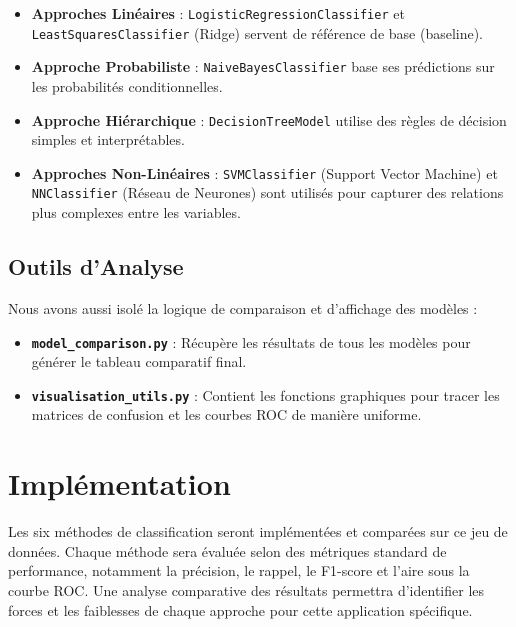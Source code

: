 \documentclass[11pt]{article}
\providecommand{\tightlist}{%
      \setlength{\itemsep}{0pt}\setlength{\parskip}{0pt}}
\begin{document}
\begin{itemize}
  \tightlist
  \item
        \textbf{Approches Linéaires} : \texttt{LogisticRegressionClassifier}
        et \texttt{LeastSquaresClassifier} (Ridge) servent de référence de
        base (baseline).
  \item
        \textbf{Approche Probabiliste} : \texttt{NaiveBayesClassifier} base
        ses prédictions sur les probabilités conditionnelles.
  \item
        \textbf{Approche Hiérarchique} : \texttt{DecisionTreeModel} utilise
        des règles de décision simples et interprétables.
  \item
        \textbf{Approches Non-Linéaires} : \texttt{SVMClassifier} (Support
        Vector Machine) et \texttt{NNClassifier} (Réseau de Neurones) sont
        utilisés pour capturer des relations plus complexes entre les
        variables.
\end{itemize}

\subsection{Outils d'Analyse}\label{outils-danalyse}

Nous avons aussi isolé la logique de comparaison et d'affichage des
modèles :

\begin{itemize}
  \tightlist
  \item
        \textbf{\texttt{model\_comparison.py}} : Récupère les résultats de
        tous les modèles pour générer le tableau comparatif final.
  \item
        \textbf{\texttt{visualisation\_utils.py}} : Contient les fonctions
        graphiques pour tracer les matrices de confusion et les courbes ROC de
        manière uniforme.
\end{itemize}

\section{Implémentation}\label{impluxe9mentation}

Les six méthodes de classification seront implémentées et comparées sur
ce jeu de données. Chaque méthode sera évaluée selon des métriques
standard de performance, notamment la précision, le rappel, le F1-score
et l'aire sous la courbe ROC. Une analyse comparative des résultats
permettra d'identifier les forces et les faiblesses de chaque approche
pour cette application spécifique.
\end{document}
